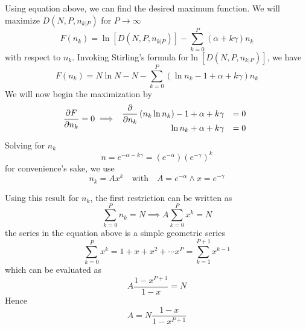\documentclass[../../../Main.tex]{subfiles}
\begin{document}
Using equation above,  we can find the desired maximum function. We will maximize $D(N , P, n_{k|P})$ for $P\rightarrow\infty$
\begin{equation*}
    F(n_k)=\ln\left[D(N , P, n_{k|P} )\right]- \sum_{k=0}^{P}(\alpha + k\gamma )n_k
\end{equation*}
with respect to $n_k$. Invoking Stirling's formula for$\ln\left[D(N , P, n_{k|P} )\right]$, we have
\begin{equation*}
    F(n_k)=N\ln N-N-\sum_{k=0}^{P}(\ln n_k -1 +\alpha + k\gamma )n_k
\end{equation*}
We will now begin the maximization by
\begin{equation*}
    \frac{\partial F}{\partial n_k}=0\implies\begin{array}{r l}
        \dfrac{\partial }{\partial n_k}\left(n_k\ln n_k\right)-1+ \alpha +k\gamma&=0\\
        \ln n_k+\alpha +k\gamma&=0
    \end{array}
\end{equation*}
Solving for $n_k$
\begin{equation*}
    n=e^{-\alpha-k\gamma}=\left(e^{-\alpha}\right)\left(e^{-\gamma}\right)^k
\end{equation*}
for convenience’s sake, we use 
\begin{equation*}
    n_k=Ax^k\quad \text{with}\quad A=e^{-\alpha}\land x=e^{-\gamma}
\end{equation*}

Using this result for $n_k$, the first restriction can be written as
\begin{equation*}
    \sum_{k=0}^{P}n_k=N\implies A\sum_{k=0}^{P}x^k=N
\end{equation*}
the series in the equation above is a simple geometric series
\begin{equation*}
    \sum_{k=0}^{P}x^k=1+x+x^2+\cdots x^P=\sum_{k=1}^{P+1}x^{k-1}
\end{equation*}
which can be evaluated as 
\begin{equation*}
    A\frac{1-x^{P+1}}{1-x}=N
\end{equation*}
Hence 
\begin{equation*}
    A=N\frac{1-x}{1-x^{P+1}}
\end{equation*}
\end{document}
